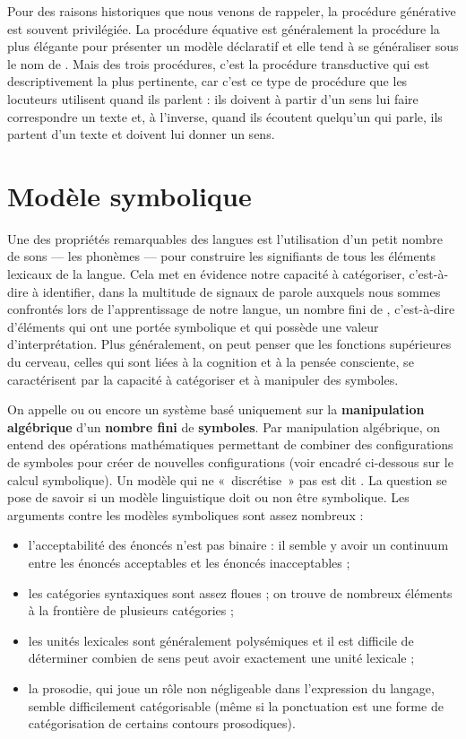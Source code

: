 {    Pour des raisons historiques que nous venons de rappeler, la procédure générative est souvent privilégiée. La procédure équative est généralement la procédure la plus élégante pour présenter un modèle déclaratif et elle tend à se généraliser sous le nom de . Mais des trois procédures, c’est la procédure transductive qui est descriptivement la plus pertinente, car c’est ce type de procédure que les locuteurs utilisent quand ils parlent : ils doivent à partir d’un sens lui faire correspondre un texte et, à l’inverse, quand ils écoutent quelqu’un qui parle, ils partent d’un texte et doivent lui donner un sens.
}
\section{Modèle symbolique}\label{sec:1.3.6}

Une des propriétés remarquables des langues est l’utilisation d’un petit nombre de sons — les phonèmes — pour construire les signifiants de tous les éléments lexicaux de la langue. Cela met en évidence notre capacité à catégoriser, c’est-à-dire à identifier, dans la multitude de signaux de parole auxquels nous sommes confrontés lors de l’apprentissage de notre langue, un nombre fini de , c’est-à-dire d’éléments qui ont une portée symbolique et qui possède une valeur d’interprétation. Plus généralement, on peut penser que les fonctions supérieures du cerveau, celles qui sont liées à la cognition et à la pensée consciente, se caractérisent par la capacité à catégoriser et à manipuler des symboles.

On appelle  ou  ou encore  un système basé uniquement sur la \textbf{manipulation algébrique} d’un \textbf{nombre fini} de \textbf{symboles}. Par manipulation algébrique, on entend des opérations mathématiques permettant de combiner des configurations de symboles pour créer de nouvelles configurations (voir encadré ci-dessous sur le calcul symbolique). Un modèle qui ne «~discrétise~» pas est dit . La question se pose de savoir si un modèle linguistique doit ou non être symbolique. Les arguments contre les modèles symboliques sont assez nombreux :

\begin{itemize}
\item l’acceptabilité des énoncés n’est pas binaire : il semble y avoir un continuum entre les énoncés acceptables et les énoncés inacceptables ;
\item les catégories syntaxiques sont assez floues ; on trouve de nombreux éléments à la frontière de plusieurs catégories ;
\item les unités lexicales sont généralement polysémiques et il est difficile de déterminer combien de sens peut avoir exactement une unité lexicale ;
\item la prosodie, qui joue un rôle non négligeable dans l’expression du langage, semble difficilement catégorisable (même si la ponctuation est une forme de catégorisation de certains contours prosodiques).
\end{itemize}

